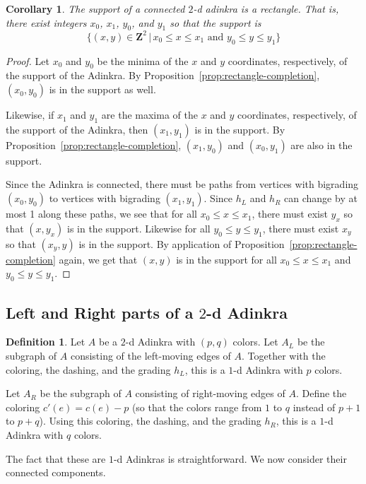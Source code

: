 \documentclass[12pt,twoside,singlespace]{article}
\numberwithin{equation}{section}
\newtheorem{cor}[equation]{Corollary}
\theoremstyle{definition}
\newtheorem{definition}[equation]{Definition}
\newcommand{\ZZ}{\mathbf{Z}}
\begin{document}
\begin{cor}
\label{cor:rectangle}
The support of a connected $2$-d adinkra is a rectangle.  That is, there exist integers $x_0$, $x_1$, $y_0$, and $y_1$ so that the support is
\[\{(x,y)\in\ZZ^2\,|\,x_0\le x\le x_1\mbox{ and }y_0\le y\le y_1\}\]
\end{cor}
\begin{proof}
Let $x_0$ and $y_0$ be the minima of the $x$ and $y$ coordinates, respectively, of the support of the Adinkra.  By Proposition~\ref{prop:rectangle-completion}, $(x_0,y_0)$ is in the support as well.

Likewise, if $x_1$ and $y_1$ are the maxima of the $x$ and $y$ coordinates, respectively, of the support of the Adinkra, then $(x_1,y_1)$ is in the support.  By Proposition~\ref{prop:rectangle-completion}, $(x_1,y_0)$ and $(x_0,y_1)$ are also in the support.

Since the Adinkra is connected, there must be paths from vertices with bigrading $(x_0,y_0)$ to vertices with bigrading $(x_1,y_1)$.  Since $h_L$ and $h_R$ can change by at most 1 along these paths, we see that for all $x_0\le x\le x_1$, there must exist $y_x$ so that $(x,y_x)$ is in the support.  Likewise for all $y_0\le y\le y_1$, there must exist $x_y$ so that $(x_y,y)$ is in the support.  By application of Proposition~\ref{prop:rectangle-completion} again, we get that $(x,y)$ is in the support for all $x_0\le x\le x_1$ and $y_0\le y\le y_1$.
\end{proof}

\subsection{Left and Right parts of a $2$-d Adinkra}
\begin{definition}
Let $A$ be a $2$-d Adinkra with $(p,q)$ colors.  Let $A_L$ be the subgraph of $A$ consisting of the left-moving edges of $A$.  Together with the coloring, the dashing, and the grading $h_L$, this is a $1$-d Adinkra with $p$ colors.

Let $A_R$ be the subgraph of $A$ consisting of right-moving edges of $A$.  Define the coloring $c'(e)=c(e)-p$ (so that the colors range from $1$ to $q$ instead of $p+1$ to $p+q$).  Using this coloring, the dashing, and the grading $h_R$, this is a $1$-d Adinkra with $q$ colors.
\end{definition}
The fact that these are $1$-d Adinkras is straightforward.  We now consider their connected components.
\end{document}
